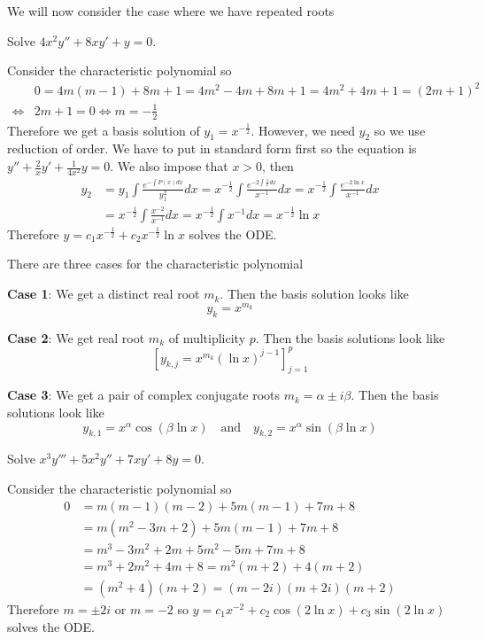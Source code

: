 \documentclass[notes]{subfiles}
\begin{document}
We will now consider the case where we have repeated roots

\begin{exercise}
    Solve $4x^2y'' + 8xy' + y = 0$.
\end{exercise}
\begin{solution}
    Consider the characteristic polynomial so
    \begin{align*}
        &0 = 4m(m - 1) + 8m + 1 = 4m^2 - 4m + 8m + 1 = 4m^2 + 4m + 1 = (2m + 1)^2 \\
        \iff& 2m + 1 = 0
        \iff m = -\frac{1}{2}
    \end{align*}
    Therefore we get a basis solution of $y_1 = x^{-\frac{1}{2}}$. However, we need $y_2$ so we use reduction of order. We have to put in standard form first so the equation is $y'' + \frac{2}{x}y' + \frac{1}{4x^2}y = 0$. We also impose that $x > 0$, then
    \begin{align*}
        y_2
        &= y_1 \int \frac{e^{-\int P(x)dx}}{y_1^2}dx
        = x^{-\frac{1}{2}} \int \frac{e^{-2\int \frac{1}{x}dx}}{x^{-1}}dx
        = x^{-\frac{1}{2}} \int \frac{e^{-2\ln x}}{x^{-1}}dx \\
        &= x^{-\frac{1}{2}} \int \frac{x^{-2}}{x^{-1}}dx
        = x^{-\frac{1}{2}} \int x^{-1}dx
        = x^{-\frac{1}{2}}\ln x
    \end{align*}
    Therefore $y = c_1x^{-\frac{1}{2}} + c_2x^{-\frac{1}{2}}\ln x$ solves the ODE.
\end{solution}

There are three cases for the characteristic polynomial

\textbf{Case 1}: We get a distinct real root $m_k$. Then the basis solution looks like
\[
    y_k = x^{m_k}
\]

\textbf{Case 2}: We get real root $m_k$ of multiplicity $p$. Then the basis solutions look like
\[
    [y_{k, j} = x^{m_k}(\ln x)^{j - 1}]_{j = 1}^p
\]

\textbf{Case 3}: We get a pair of complex conjugate roots $m_k = \alpha \pm i\beta$. Then the basis solutions look like
\[
    y_{k, 1} = x^\alpha \cos(\beta \ln x) \quad \text{and} \quad y_{k, 2} = x^\alpha \sin(\beta \ln x)
\]

\begin{exercise}
    Solve $x^3 y''' + 5x^2 y'' + 7xy' + 8y = 0$.
\end{exercise}
\begin{solution}
    Consider the characteristic polynomial so
    \begin{align*}
        0
        &= m(m - 1)(m - 2) + 5m(m - 1) + 7m + 8 \\
        &= m(m^2 - 3m + 2) + 5m(m - 1) + 7m + 8 \\
        &= m^3 - 3m^2 + 2m + 5m^2 - 5m + 7m + 8 \\
        &= m^3 + 2m^2 + 4m + 8
        = m^2(m + 2) + 4(m + 2) \\
        &= (m^2 + 4)(m + 2)
        = (m - 2i)(m + 2i)(m + 2)
    \end{align*}
    Therefore $m = \pm 2i$ or $m = -2$ so $y = c_1x^{-2} + c_2\cos(2\ln x) + c_3\sin(2\ln x)$ solves the ODE.
\end{solution}
\end{document}
